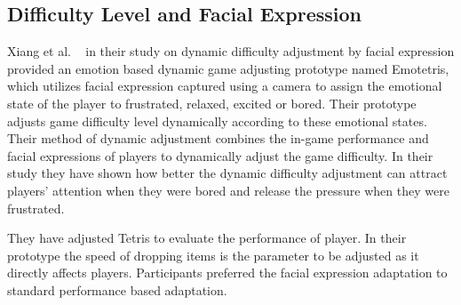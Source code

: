 \subsection{Difficulty Level and Facial Expression}
Xiang et al. ~\cite{xiang2013dynamic} in their study on dynamic difficulty adjustment by facial expression provided an emotion based dynamic game adjusting prototype named Emotetris, which utilizes facial expression captured using a camera to assign the emotional state of the player to frustrated, relaxed, excited or bored. Their prototype adjusts game difficulty level dynamically according to these emotional states. Their method of dynamic adjustment combines the in-game performance and facial expressions of players to dynamically adjust the game difficulty. In their study they have shown how better the dynamic difficulty adjustment can attract players' attention when they were bored and release the pressure when they were frustrated.

They have adjusted Tetris to evaluate the performance of player. In their prototype the speed of dropping items is the parameter to be adjusted as it directly affects players. Participants preferred the facial expression adaptation to standard performance based adaptation.


